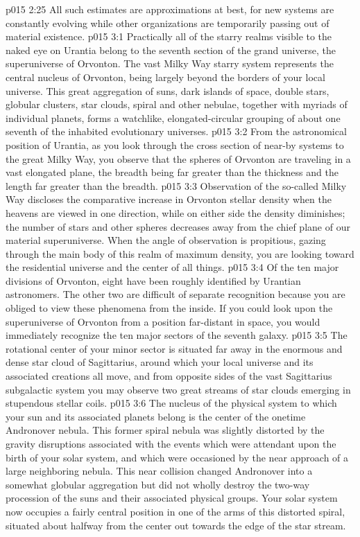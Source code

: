 \vs p015 2:25 \pc All such estimates are approximations at best, for new systems are constantly evolving while other organizations are temporarily passing out of material existence.
\vs p015 3:1 Practically all of the starry realms visible to the naked eye on Urantia belong to the seventh section of the grand universe, the superuniverse of Orvonton. The vast Milky Way starry system represents the central nucleus of Orvonton, being largely beyond the borders of your local universe. This great aggregation of suns, dark islands of space, double stars, globular clusters, star clouds, spiral and other nebulae, together with myriads of individual planets, forms a watchlike, elongated\hyp{}circular grouping of about one seventh of the inhabited evolutionary universes.
\vs p015 3:2 From the astronomical position of Urantia, as you look through the cross section of near\hyp{}by systems to the great Milky Way, you observe that the spheres of Orvonton are traveling in a vast elongated plane, the breadth being far greater than the thickness and the length far greater than the breadth.
\vs p015 3:3 Observation of the so\hyp{}called Milky Way discloses the comparative increase in Orvonton stellar density when the heavens are viewed in one direction, while on either side the density diminishes; the number of stars and other spheres decreases away from the chief plane of our material superuniverse. When the angle of observation is propitious, gazing through the main body of this realm of maximum density, you are looking toward the residential universe and the center of all things.
\vs p015 3:4 \pc Of the ten major divisions of Orvonton, eight have been roughly identified by Urantian astronomers. The other two are difficult of separate recognition because you are obliged to view these phenomena from the inside. If you could look upon the superuniverse of Orvonton from a position far\hyp{}distant in space, you would immediately recognize the ten major sectors of the seventh galaxy.
\vs p015 3:5 The rotational center of your minor sector is situated far away in the enormous and dense star cloud of Sagittarius, around which your local universe and its associated creations all move, and from opposite sides of the vast Sagittarius subgalactic system you may observe two great streams of star clouds emerging in stupendous stellar coils.
\vs p015 3:6 The nucleus of the physical system to which your sun and its associated planets belong is the center of the onetime Andronover nebula. This former spiral nebula was slightly distorted by the gravity disruptions associated with the events which were attendant upon the birth of your solar system, and which were occasioned by the near approach of a large neighboring nebula. This near collision changed Andronover into a somewhat globular aggregation but did not wholly destroy the two\hyp{}way procession of the suns and their associated physical groups. Your solar system now occupies a fairly central position in one of the arms of this distorted spiral, situated about halfway from the center out towards the edge of the star stream.
